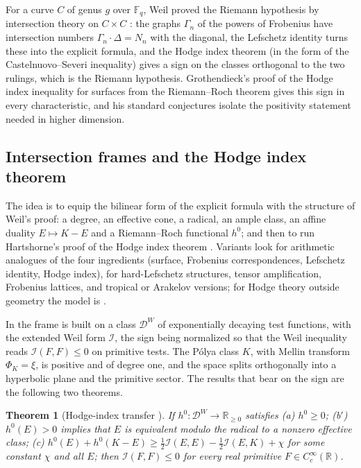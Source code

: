 \documentclass[11pt]{amsart}
\newtheorem{theorem}{Theorem}[section]
\theoremstyle{definition}
\theoremstyle{remark}
\numberwithin{equation}{section}
\newcommand{\R}{\mathbb{R}}
\begin{document}
For a curve $C$ of genus $g$ over $\mathbb F_q$, Weil proved the Riemann hypothesis by intersection theory on
$C\times C$ \cite{Weil48}: the graphs $\Gamma_n$ of the powers of Frobenius have intersection numbers
$\Gamma_n\cdot\Delta=N_n$ with the diagonal, the Lefschetz identity turns these into the explicit formula, and
the Hodge index theorem (in the form of the Castelnuovo--Severi inequality) gives a sign on the classes
orthogonal to the two rulings, which is the Riemann hypothesis. Grothendieck's proof of the Hodge index
inequality for surfaces from the Riemann--Roch theorem \cite{Grothendieck1958} gives this sign in every
characteristic, and his standard conjectures \cite{Grothendieck1969} isolate the positivity statement needed in
higher dimension.

\subsection{Intersection frames and the Hodge index theorem}\label{w7:fam:R21}

The idea is to equip the bilinear form of the explicit formula with the structure of Weil's proof: a degree, an
effective cone, a radical, an ample class, an affine duality $E\mapsto K-E$ and a Riemann--Roch functional
$h^0$; and then to run Hartshorne's proof of the Hodge index theorem \cite[Ch.~V, Theorem~1.9]{Hartshorne1977}.
Variants look for arithmetic analogues of the four ingredients (surface, Frobenius correspondences, Lefschetz
identity, Hodge index), for hard-Lefschetz structures, tensor amplification, Frobenius lattices, and tropical or
Arakelov versions; for Hodge theory outside geometry the model is \cite{AdiprasitoHuhKatz2018}.

In \cite{P47} the frame is built on a class $\mathcal D^W$ of exponentially decaying test functions, with the
extended Weil form $\mathcal I$, the sign being normalized so that the Weil inequality reads
$\mathcal I(F,F)\le0$ on primitive tests. The P\'olya class $K$, with Mellin transform $\Phi_K=\xi$, is positive
and of degree one, and the space splits orthogonally into a hyperbolic plane and the primitive sector. The
results that bear on the sign are the following two theorems.

\begin{theorem}[Hodge-index transfer {\cite[Theorem~6.1]{P47}}]\label{w7:thm:transfer}
If $h^0:\mathcal D^W\to\R_{\ge0}$ satisfies (a) $h^0\ge0$; (b$'$) $h^0(E)>0$ implies that $E$ is equivalent
modulo the radical to a nonzero effective class; (c) $h^0(E)+h^0(K-E)\ge\frac12\mathcal I(E,E)-\frac12\mathcal
I(E,K)+\chi$ for some constant $\chi$ and all $E$; then $\mathcal I(F,F)\le0$ for every real primitive
$F\in C_c^\infty(\R)$.
\end{theorem}
\end{document}
